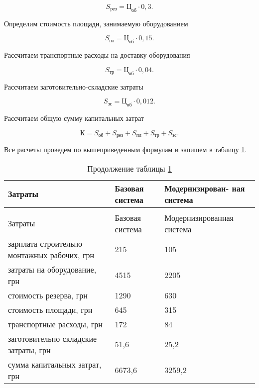         \begin{equation}
            S_\text{рез} = \text{Ц}_\text{об} \cdot 0,3.
        \end{equation}

        Определим стоимость площади, занимаемую оборудованием
       
        \begin{equation}
            S_\text{пл} = \text{Ц}_\text{об} \cdot 0,15.
        \end{equation}

        Рассчитаем транспортные расходы на доставку оборудования

        \begin{equation}
            S_\text{тр} = \text{Ц}_\text{об} \cdot 0,04.
        \end{equation}

        Рассчитаем заготовительно-складские затраты

        \begin{equation}
            S_\text{зс} = \text{Ц}_{об} \cdot 0,012. 
        \end{equation}

        Рассчитаем общую сумму капитальных затрат

        \begin{equation}
            К = S_\text{об} + S_\text{рез} +
                S_\text{пл} + S_\text{тр} + S_\text{зс}. 
        \end{equation}

        Все расчеты проведем по вышеприведенным формулам и запишем в таблицу
        \ref{table:capital-cost}.

        \begin{longtable}{|p{8cm}|p{3cm}|p{4cm}|}
            \caption{Капитальные затраты на оборудование
                \label{table:capital-cost}}\\
            \hline
            Затраты & Базовая система & Модернизирован- ная система\\
            \hline
            \endfirsthead
            \caption*{Продолжение таблицы \ref{table:capital-cost}}\\
            \hline
            Затраты & Базовая система & Модернизированная система\\
            \endhead
            \hline
            зарплата строительно-монтажных рабочих, грн & 215 & 105\\
            \hline
            затраты на оборудование, грн & 4515 & 2205\\
            \hline
            стоимость резерва, грн & 1290 & 630\\
            \hline
            стоимость площади, грн & 645 & 315\\
            \hline
            транспортные расходы, грн & 172 & 84\\
            \hline
            заготовительно-складские затраты, грн & 51,6 & 25,2\\
            \hline
            сумма капитальных затрат, грн & 6673,6 & 3259,2\\
            \hline
        \end{longtable}

